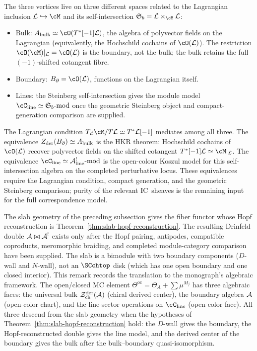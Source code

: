 \begin{remark}
\label{rem:steinberg-triangle}
The three vertices live on three different spaces related to the
Lagrangian inclusion $\cL \hookrightarrow \cM$ and its
self-intersection
$\mathfrak{S}_b = \cL \times_{\cM} \cL$:
\begin{itemize}
\item Bulk:
 $A_{\mathrm{bulk}} \simeq \cO(T^\ast[-1]\cL)$, the algebra of
 polyvector fields on the Lagrangian (equivalently, the Hochschild
 cochains of $\cO(\cL)$). The restriction
 $\cO(\cM)|_{\cL} = \cO(\cL)$ is the boundary, not the bulk; the
 bulk retains the full $(-1)$-shifted cotangent fibre.
\item Boundary: $B_\partial = \cO(\cL)$, functions on the
 Lagrangian itself.
\item Lines:
 the Steinberg self-intersection gives the module model
 $\cC_{\mathrm{line}}\simeq\mathfrak{S}_b\text{-mod}$ once the
 geometric Steinberg object and compact-generation comparison are
 supplied.
\end{itemize}
The Lagrangian condition
$T_{\cL}\cM / T\cL \simeq T^*\cL[-1]$ mediates among all three.
The equivalence $Z_{\mathrm{der}}(B_\partial) \simeq A_{\mathrm{bulk}}$
is the HKR theorem: Hochschild cochains of $\cO(\cL)$ recover
polyvector fields on the shifted cotangent
$T^*[-1]\cL \simeq \cM|_{\cL}$.
The equivalence
$\cC_{\mathrm{line}} \simeq \cA^!_{\mathrm{line}}\text{-mod}$ is the
open-colour Koszul model for this self-intersection algebra on the
completed perturbative locus. These equivalences require the
Lagrangian condition, compact generation, and the geometric
Steinberg comparison; purity of the relevant IC~sheaves is the
remaining input for the full correspondence model.
\end{remark}

\begin{remark}
\label{rem:slab-fiber-functor}
The slab geometry of the preceding subsection gives the fiber functor
whose Hopf reconstruction is Theorem~\ref{thm:slab-hopf-reconstruction}.
The resulting Drinfeld double $\mathcal{A}\bowtie\mathcal{A}^!$ exists only after the
Hopf pairing, antipodes, compatible coproducts, meromorphic braiding,
and completed module-category comparison have been supplied. The slab
is a bimodule with two boundary components ($D$-wall and $N$-wall), not
an $\SCchtop$ disk (which has one open boundary and one closed
interior). This remark records the translation to the monograph's
algebraic framework.
The open/closed MC element
$\Theta^{\mathrm{oc}} = \Theta_A + \sum \mu^{M_j}$ has three
algebraic faces: the universal bulk
$\mathcal{Z}^{\mathrm{der}}_{\mathrm{ch}}(\mathcal{A})$ (chiral derived center),
the boundary algebra $\mathcal{A}$ (open-color chart), and the line-sector
operations on $\cC_{\mathrm{line}}$ (open-color face). All three
descend from the slab geometry when the hypotheses of
Theorem~\ref{thm:slab-hopf-reconstruction} hold: the $D$-wall gives
the boundary, the Hopf-reconstructed double gives the line model, and
the derived center of the boundary gives the bulk after the
bulk--boundary quasi-isomorphism.
\end{remark}

